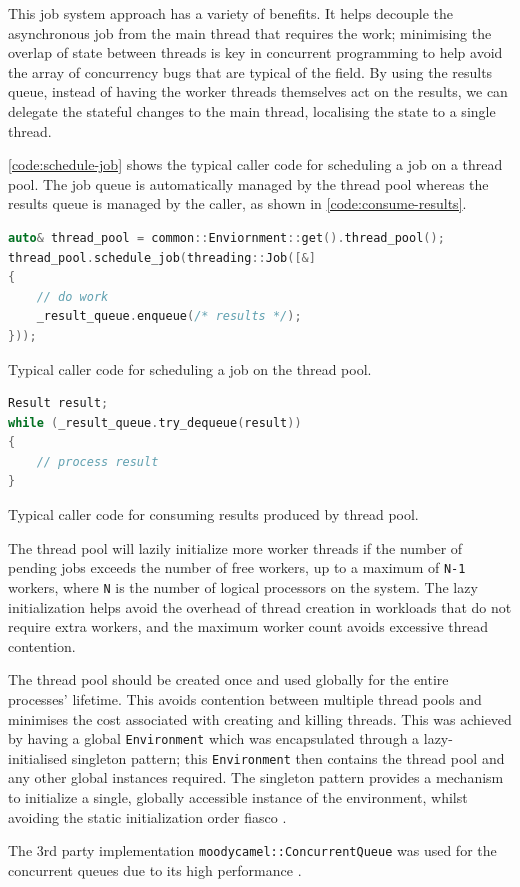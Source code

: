 This job system approach has a variety of benefits. It helps decouple the asynchronous job from the main thread that requires the work; minimising the overlap of state between threads is key in concurrent programming to help avoid the array of concurrency bugs that are typical of the field. By using the results queue, instead of having the worker threads themselves act on the results, we can delegate the stateful changes to the main thread, localising the state to a single thread.

\autoref{code:schedule-job} shows the typical caller code for scheduling a job on a thread pool. The job queue is automatically managed by the thread pool whereas the results queue is managed by the caller, as shown in \autoref{code:consume-results}.

\begin{lstfloat}[H]
    \begin{lstlisting}[language=c++]
auto& thread_pool = common::Enviornment::get().thread_pool();
thread_pool.schedule_job(threading::Job([&]
{
    // do work
    _result_queue.enqueue(/* results */);
}));
    \end{lstlisting}
    \caption{Typical caller code for scheduling a job on the thread pool. }
    \label{code:schedule-job}
\end{lstfloat}

\begin{lstfloat}[H]
    \begin{lstlisting}[language=c++]
Result result;
while (_result_queue.try_dequeue(result))
{
    // process result
}
    \end{lstlisting}
    \caption{Typical caller code for consuming results produced by thread pool.}
    \label{code:consume-results}
\end{lstfloat}

The thread pool will lazily initialize more worker threads if the number of pending jobs exceeds the number of free workers, up to a maximum of \texttt{N-1} workers, where \texttt{N} is the number of logical processors on the system. The lazy initialization helps avoid the overhead of thread creation in workloads that do not require extra workers, and the maximum worker count avoids excessive thread contention.

The thread pool should be created once and used globally for the entire processes' lifetime. This avoids contention between multiple thread pools and minimises the cost associated with creating and killing threads. This was achieved by having a global \texttt{Environment} which was encapsulated through a lazy-initialised singleton pattern; this \texttt{Environment} then contains the thread pool and any other global instances required. The singleton pattern provides a mechanism to initialize a single, globally accessible instance of the environment, whilst avoiding the static initialization order fiasco \cite{cpp-siof}.

The 3rd party implementation \texttt{moodycamel::ConcurrentQueue} \cite{moodycamel} was used for the concurrent queues due to its high performance \cite{moodycamel-benchmark}.

